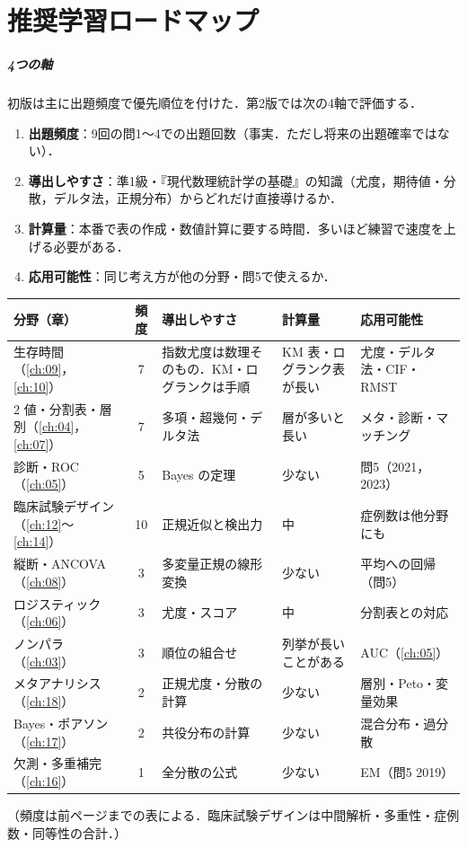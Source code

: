 \documentclass[a4paper,11pt,openany]{ltjsbook}
\begin{document}
\chapter*{推奨学習ロードマップ}

\paragraph{4つの軸}
初版は主に出題頻度で優先順位を付けた．第2版では次の4軸で評価する．
\begin{enumerate}[label=(\arabic*)]
\item \textbf{出題頻度}：9回の問1〜4での出題回数（事実．ただし将来の出題確率ではない）．
\item \textbf{導出しやすさ}：準1級・『現代数理統計学の基礎』の知識（尤度，期待値・分散，デルタ法，正規分布）からどれだけ直接導けるか．
\item \textbf{計算量}：本番で表の作成・数値計算に要する時間．多いほど練習で速度を上げる必要がある．
\item \textbf{応用可能性}：同じ考え方が他の分野・問5で使えるか．
\end{enumerate}
\begin{center}\small
\setlength{\tabcolsep}{3pt}
\begin{tabular}{@{}L{44mm}cL{30mm}L{30mm}L{35mm}@{}}
\toprule
分野（章） & 頻度 & 導出しやすさ & 計算量 & 応用可能性\\
\midrule
生存時間（\ref{ch:09}，\ref{ch:10}） & 7 & 指数尤度は数理そのもの．KM・ログランクは手順 & KM 表・ログランク表が長い & 尤度・デルタ法・CIF・RMST\\
2 値・分割表・層別（\ref{ch:04}，\ref{ch:07}） & 7 & 多項・超幾何・デルタ法 & 層が多いと長い & メタ・診断・マッチング\\
診断・ROC（\ref{ch:05}） & 5 & Bayes の定理 & 少ない & 問5（2021，2023）\\
臨床試験デザイン（\ref{ch:12}〜\ref{ch:14}） & 10 & 正規近似と検出力 & 中 & 症例数は他分野にも\\
縦断・ANCOVA（\ref{ch:08}） & 3 & 多変量正規の線形変換 & 少ない & 平均への回帰（問5）\\
ロジスティック（\ref{ch:06}） & 3 & 尤度・スコア & 中 & 分割表との対応\\
ノンパラ（\ref{ch:03}） & 3 & 順位の組合せ & 列挙が長いことがある & AUC（\ref{ch:05}）\\
メタアナリシス（\ref{ch:18}） & 2 & 正規尤度・分散の計算 & 少ない & 層別・Peto・変量効果\\
Bayes・ポアソン（\ref{ch:17}） & 2 & 共役分布の計算 & 少ない & 混合分布・過分散\\
欠測・多重補完（\ref{ch:16}） & 1 & 全分散の公式 & 少ない & EM（問5 2019）\\
\bottomrule
\end{tabular}
\end{center}
（頻度は前ページまでの表による．臨床試験デザインは中間解析・多重性・症例数・同等性の合計．）
\end{document}
